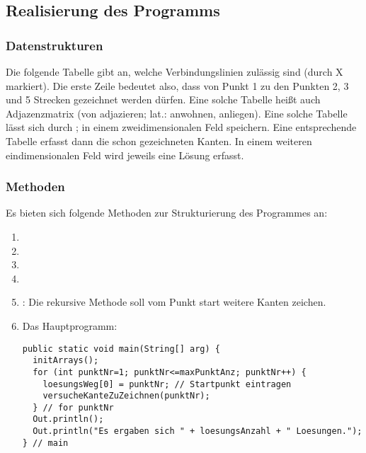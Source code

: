 \documentclass{lehramt-informatik-aufgabe}
\begin{document}
\subsection{Realisierung des Programms}

\subsubsection{Datenstrukturen}

Die folgende Tabelle gibt an, welche Verbindungslinien zulässig sind
(durch X markiert). Die erste Zeile bedeutet also, dass von Punkt 1 zu
den Punkten 2, 3 und 5 Strecken gezeichnet werden dürfen. Eine solche
Tabelle heißt auch Adjazenzmatrix (von adjazieren; lat.: anwohnen,
anliegen). Eine solche Tabelle lässt sich durch ; in einem zweidimensionalen Feld speichern. Eine
entsprechende Tabelle  erfasst dann die
schon gezeichneten Kanten. In einem weiteren eindimensionalen Feld
wird jeweils eine Lösung erfasst.

\subsubsection{Methoden}

Es bieten sich folgende Methoden zur Strukturierung des Programmes an:

\begin{enumerate}
\item {}
\item {}
\item {}
\item {}
\item {}: Die rekursive
Methode soll vom Punkt start weitere Kanten zeichen.

\item Das Hauptprogramm:

\begin{verbatim}
public static void main(String[] arg) {
  initArrays();
  for (int punktNr=1; punktNr<=maxPunktAnz; punktNr++) {
    loesungsWeg[0] = punktNr; // Startpunkt eintragen
    versucheKanteZuZeichnen(punktNr);
  } // for punktNr
  Out.println();
  Out.println("Es ergaben sich " + loesungsAnzahl + " Loesungen.");
} // main
\end{verbatim}

\end{enumerate}

\end{document}
